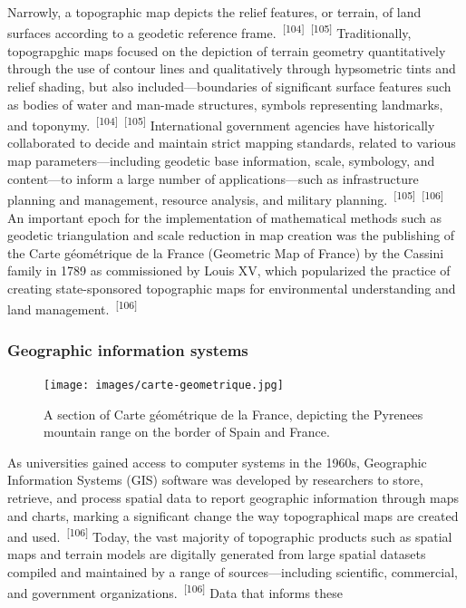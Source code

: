 \documentclass{article}
\begin{document}

\par{Narrowly, a topographic map depicts the relief features, or terrain, of land surfaces according to a geodetic reference frame.~\textsuperscript{[104]}~\textsuperscript{[105]} Traditionally, topograpghic maps focused on the depiction of terrain geometry quantitatively through the use of contour lines and qualitatively through hypsometric tints and relief shading, but also included---boundaries of significant surface features such as bodies of water and man-made structures, symbols representing landmarks, and toponymy.~\textsuperscript{[104]}~\textsuperscript{[105]} International government agencies have historically collaborated to decide and maintain strict mapping standards, related to various map parameters---including geodetic base information, scale, symbology, and content---to inform a large number of applications---such as infrastructure planning and management, resource analysis, and military planning.~\textsuperscript{[105]}~\textsuperscript{[106]} An important epoch for the implementation of mathematical methods such as geodetic triangulation and scale reduction in map creation was the publishing of the Carte géométrique de la France (Geometric Map of France) by the Cassini family in 1789 as commissioned by Louis XV, which popularized the practice of creating state-sponsored topographic maps for environmental understanding and land management.~\textsuperscript{[106]}}

\subsubsection{Geographic information systems}

\begin{figure}
    \centering
    \texttt{[image: images/carte-geometrique.jpg]}
    \caption{A section of Carte géométrique de la France, depicting the Pyrenees mountain range on the border of Spain and France.}
    \label{figure28}
\end{figure}


\par{As universities gained access to computer systems in the 1960s, Geographic Information Systems (GIS) software was developed by researchers to store, retrieve, and process spatial data to report geographic information through maps and charts, marking a significant change the way topographical maps are created and used.~\textsuperscript{[106]} Today, the vast majority of topographic products such as spatial maps and terrain models are digitally generated from large spatial datasets compiled and maintained by a range of sources---including scientific, commercial, and government organizations.~\textsuperscript{[106]} Data that informs these}
\end{document}

